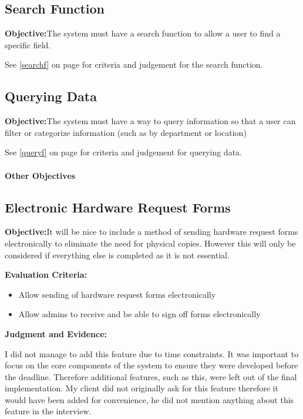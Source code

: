 \subsection{Search Function}

\textbf{Objective:}The system must have a search function to allow a user to find a specific field.

See \ref{searchf} on page \pageref{searchf}  for criteria and judgement for the search function.

\subsection{Querying Data}

\textbf{Objective:}The system must have a way to query information so that a user can filter or categorize information (such as by department or location)

See \ref{queryf} on page \pageref{queryf} for criteria and judgement for querying data.



\paragraph{Other Objectives}

\subsection{Electronic Hardware Request Forms}

\textbf{Objective:}It will be nice to include a method of sending hardware request forms electronically to eliminate the need for physical copies. However this will only be considered if everything else is completed as it is not essential.

\textbf{Evaluation Criteria:}
\begin{itemize}
\item{Allow sending of hardware request forms electronically}
\item{Allow admins to receive and be able to sign off forms electronically}
\end{itemize}

\textbf{Judgment and Evidence:}

I did not manage to add this feature due to time constraints. It was important to focus on the core components of the system to ensure they were developed before the deadline. Therefore additional features, such as this, were left out of the final implementation. My client did not originally ask for this feature therefore it would have been added for convenience, he did not mention anything about this feature in the interview.

